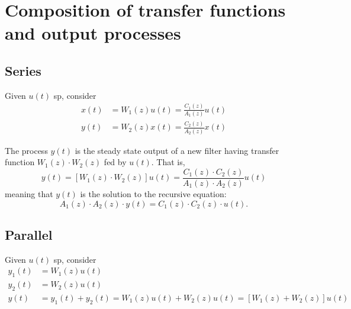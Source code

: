 
\section{Composition of transfer functions and output processes}
\subsection{Series}
Given $u(t)$ \gls{sp}, consider
\begin{align*}
	x(t)&=W_{1}(z)u(t)=\frac{C_{1}(z)}{A_{1}(z)}u(t)\\
	y(t)&=W_{2}(z)x(t)=\frac{C_{2}(z)}{A_{2}(z)}x(t)
\end{align*}

\begin{figure}[htpb]
	\centering
\end{figure}
\FloatBarrier

\begin{thm}
	The process $y(t)$ is the steady state output of a new filter having transfer function $W_{1}(z)\cdot W_{2}(z)$ fed by $u(t)$. That is,
	\[
		y(t)=[W_{1}(z)\cdot W_{2}(z)]u(t)=\frac{C_{1}(z)\cdot C_{2}(z)}{A_{1}(z)\cdot A_{2}(z)}u(t)
	\]
	meaning that $y(t)$ is the solution to the recursive equation:
	\[
		A_{1}(z)\cdot A_{2}(z)\cdot y(t) = C_{1}(z)\cdot C_{2}(z)\cdot u(t).
	\]
\end{thm}

\subsection{Parallel}
Given $u(t)$ \gls{sp}, consider
\begin{align*}
	y_{1}(t)&=W_{1}(z)u(t)\\
	y_{2}(t)&=W_{2}(z)u(t)\\
	y(t)&=y_{1}(t)+y_{2}(t)=W_{1}(z)u(t)+W_{2}(z)u(t)=[W_{1}(z)+W_{2}(z)]u(t)
\end{align*}

